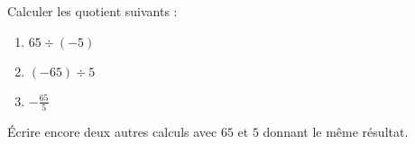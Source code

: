 
\begin{exercice}\label{exosmath-0748}

    Calculer les quotient suivants :
    \begin{multicols}{2}
        \begin{enumerate}
            \item
                \( 65\div (-5)\)
            \item
                \( (-65)\div 5\)
            \item
                \( -\frac{ 65 }{ 5 }\)
        \end{enumerate}
    \end{multicols}
    Écrire encore deux autres calculs avec \( 65\) et \( 5\) donnant le même résultat.

\end{exercice}
